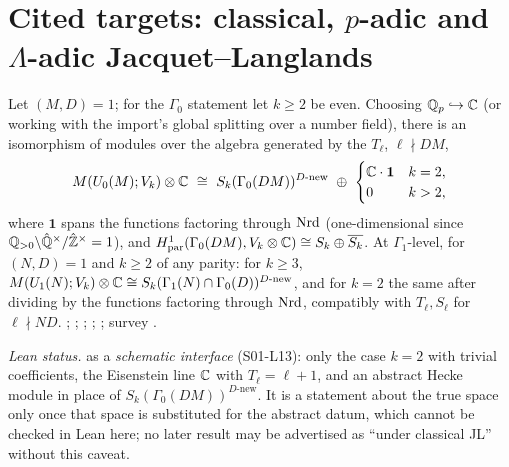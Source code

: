 \section{Cited targets: classical, $p$-adic and $\Lambda$-adic Jacquet--Langlands}

\begin{theorem}\label{thm:s01-JLclassical}
Let $(M,D)=1$; for the $\Gamma_0$ statement let $k\ge2$ be even. Choosing $\mathbb{Q}_p\hookrightarrow\mathbb{C}$ (or working with the import's global splitting over a number
field), there is an isomorphism of modules over the algebra generated by the $T_\ell$, $\ell\nmid DM$,
\[\Brandt{\Uzero{M}}{V_k}\otimes\C\ \cong\ S_k(\Gamma_0(DM))^{D\text{-new}}\ \oplus\ \begin{cases}\C\cdot\mathbf 1&k=2,\\0&k>2,\end{cases}\]
where $\mathbf 1$ spans the functions factoring through $\mathrm{Nrd}$ (one-dimensional since $\mathbb{Q}_{>0}\backslash\hat{\mathbb{Q}}^\times/\hat{\mathbb{Z}}^\times=1$),
and $H^1_{\rm par}(\Gamma_0(DM),V_k\otimes\mathbb{C})\cong S_k\oplus\overline{S_k}$. At $\Gamma_1$-level, for $(N,D)=1$ and $k\ge2$ of any parity: for $k\ge3$,
$M(U_1(N);V_k)\otimes\mathbb{C}\cong S_k(\Gamma_1(N)\cap\Gamma_0(D))^{D\text{-new}}$, and for $k=2$ the same after dividing
by the functions factoring through $\mathrm{Nrd}$, compatibly with $T_\ell,S_\ell$ for $\ell\nmid ND$.
\stcited{} ; ; ; ;
;
survey .
\end{theorem}
\noindent\emph{Lean status.}  \stformal{} as a \emph{schematic interface} (S01-L13): only the case $k=2$
with trivial coefficients, the Eisenstein line $\mathbb{C}$ with $T_\ell=\ell+1$, and an abstract Hecke module in place of
$S_k(\Gamma_0(DM))^{D\text{-new}}$. It is a statement about the true space only once that space is substituted for the abstract datum, which cannot be checked
in Lean here; no later result may be advertised as ``under classical JL'' without this caveat.

